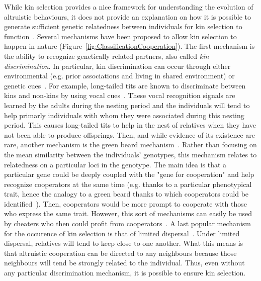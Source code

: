     While kin selection provides a nice framework for understanding the evolution of altruistic behaviours, it does not provide an explanation on how it is possible to generate sufficient genetic relatedness between individuals for kin selection to function~\parencite{West2007}. Several mechanisms have been proposed to allow kin selection to happen in nature (Figure~\ref{fig:ClassificationCooperation}). The first mechanism is the ability to recognize genetically related partners, also called \emph{kin discrimination}. In particular, kin discrimination can occur through either environmental (e.g. prior associations and living in shared environment) or genetic cues~\parencite{Grafen1990}. For example, long-tailed tits are known to discriminate between kins and non-kins by using vocal cues~\parencite{Russell2001, Sharp2005}. These vocal recognition signals are learned by the adults during the nesting period and the individuals will tend to help primarly individuals with whom they were associated during this nesting period. This causes long-tailed tits to help in the nest of relatives when they have not been able to produce offsprings. Then, and while evidence of its existence are rare, another mechanism is the green beard mechanism~\parencite{Hamilton1964, Lehmann2006}. Rather than focusing on the mean similarity between the individuals' genotypes, this mechanism relates to relatedness on a particular loci in the genotype. The main idea is that a particular gene could be deeply coupled with the "gene for cooperation" and help recognize cooperators at the same time (e.g. thanks to a particular phenotypical trait, hence the analogy to a green beard thanks to which cooperators could be identified~\parencite{Dawkins1976}). Then, cooperators would be more prompt to cooperate with those who express the same trait. However, this sort of mechanisms can easily be used by cheaters who then could profit from cooperators~\parencite{West2007}. A last popular mechanism for the occurence of kin selection is that of limited dispersal~\parencite{Hamilton1972, Griffin2003}. Under limited dispersal, relatives will tend to keep close to one another. What this means is that altruistic cooperation can be directed to any neighbours because those neighbours will tend be strongly related to the individual. Thus, even without any particular discrimination mechanism, it is possible to ensure kin selection.


